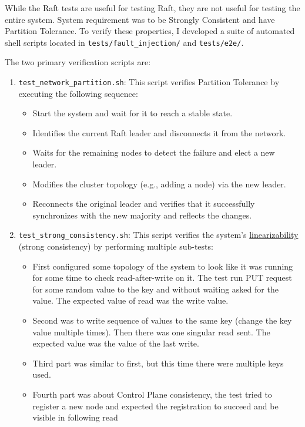 \documentclass[shortabstract]{iithesis}
\begin{document}
While the Raft tests are useful for testing Raft, they are not useful for testing the entire system. System requirement was to be Strongly Consistent and have Partition Tolerance. To verify these properties, I developed a suite of automated shell scripts located in \texttt{tests/fault\_injection/} and \texttt{tests/e2e/}.

The two primary verification scripts are:
\begin{enumerate}
    \item \texttt{test\_network\_partition.sh}: This script verifies Partition Tolerance by executing the following sequence:
    \begin{itemize}
        \item Start the system and wait for it to reach a stable state.
        \item Identifies the current Raft leader and disconnects it from the network.
        \item Waits for the remaining nodes to detect the failure and elect a new leader.
        \item Modifies the cluster topology (e.g., adding a node) via the new leader.
        \item Reconnects the original leader and verifies that it successfully synchronizes with the new majority and reflects the changes.
    \end{itemize}
    \item \texttt{test\_strong\_consistency.sh}: This script verifies the system's \hyperref[subsec:strong_consistency]{linearizability} (strong consistency) by performing multiple sub-tests:
    \begin{itemize}
        \item First configured some topology of the system to look like it was running for some time to check read-after-write on it. The test run PUT request for some random value to the key and without waiting asked for the value. The expected value of read was the write value.
        \item Second was to write sequence of values to the same key (change the key value multiple times). Then there was one singular read sent. The expected value was the value of the last write.
        \item Third part was similar to first, but this time there were multiple keys used.
        \item Fourth part was about Control Plane consistency, the test tried to register a new node and expected the registration to succeed and be visible in following read 

\end{itemize}
\end{enumerate}
\end{document}
